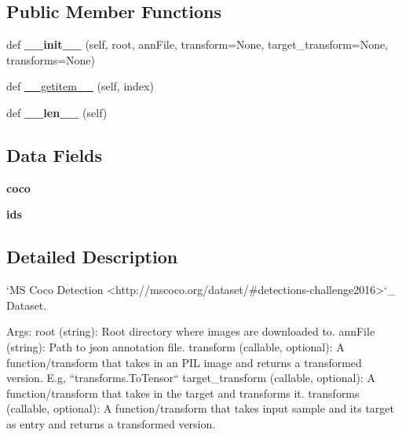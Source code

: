\subsection*{Public Member Functions}
\begin{DoxyCompactItemize}
\item 
\mbox{\label{classtorchvision_1_1datasets_1_1coco_1_1CocoDetection_a303c9fcd3394aa054b5dead9a943fbe9}} 
def {\bfseries \+\_\+\+\_\+init\+\_\+\+\_\+} (self, root, ann\+File, transform=None, target\+\_\+transform=None, transforms=None)
\item 
def \hyperlink{classtorchvision_1_1datasets_1_1coco_1_1CocoDetection_ad857435693ecdbbaf58935b4786f1d4c}{\+\_\+\+\_\+getitem\+\_\+\+\_\+} (self, index)
\item 
\mbox{\label{classtorchvision_1_1datasets_1_1coco_1_1CocoDetection_acc8a6c523c9ed8077040cc7866a910cf}} 
def {\bfseries \+\_\+\+\_\+len\+\_\+\+\_\+} (self)
\end{DoxyCompactItemize}
\subsection*{Data Fields}
\begin{DoxyCompactItemize}
\item 
\mbox{\label{classtorchvision_1_1datasets_1_1coco_1_1CocoDetection_a830f568cb4c448c8275968caf40146cd}} 
{\bfseries coco}
\item 
\mbox{\label{classtorchvision_1_1datasets_1_1coco_1_1CocoDetection_a37d9a3ec74881590262abf6fe183448f}} 
{\bfseries ids}
\end{DoxyCompactItemize}


\subsection{Detailed Description}
\begin{DoxyVerb}`MS Coco Detection <http://mscoco.org/dataset/#detections-challenge2016>`_ Dataset.

Args:
    root (string): Root directory where images are downloaded to.
    annFile (string): Path to json annotation file.
    transform (callable, optional): A function/transform that  takes in an PIL image
        and returns a transformed version. E.g, ``transforms.ToTensor``
    target_transform (callable, optional): A function/transform that takes in the
        target and transforms it.
    transforms (callable, optional): A function/transform that takes input sample and its target as entry
        and returns a transformed version.
\end{DoxyVerb}
 

